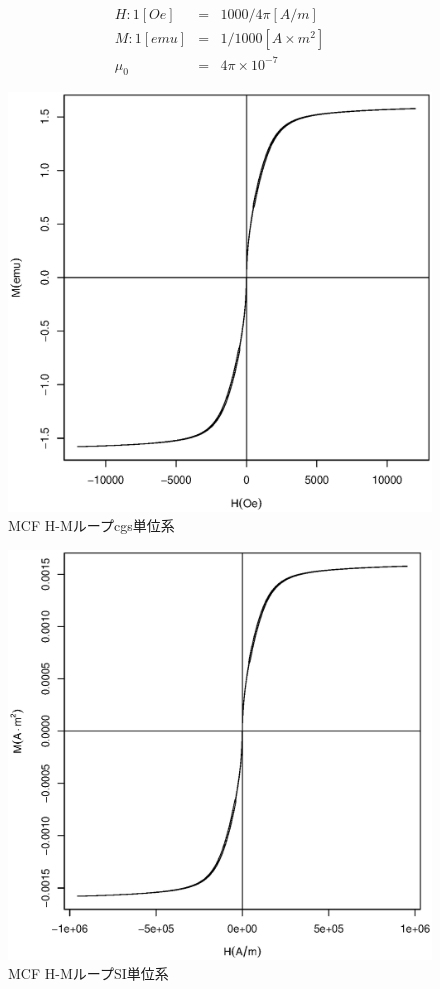 \documentclass[12pt]{jarticle}
\begin{document}
  \begin{eqnarray}
    H: 1 [Oe] &=&  1000 / 4\pi[A/m] \\
    M: 1 [emu] &=& 1 / 1000 [A \times m^2] \\
    \mu_{0} &=& 4 \pi \times 10^{-7}
  \end{eqnarray}

  \begin{figure}[htb]
    \begin{center}
      \includegraphics[width=125mm]{MagCharMCF_cgs.eps}
    \end{center}
    \caption{MCF H-Mループcgs単位系}
    \label{fig:MCF_cgs}
  \end{figure}

  \begin{figure}[htb]
    \begin{center}
      \includegraphics[width=125mm]{MagCharMCF_SI.eps}
    \end{center}
    \caption{MCF H-MループSI単位系}
    \label{fig:MCF_SI}
  \end{figure}
\end{document}

